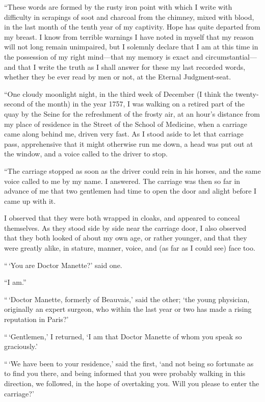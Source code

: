 ``These words are formed by the rusty iron point with which I write
with difficulty in scrapings of soot and charcoal from the chimney,
mixed with blood, in the last month of the tenth year of my captivity.
Hope has quite departed from my breast.  I know from terrible
warnings I have noted in myself that my reason will not long remain
unimpaired, but I solemnly declare that I am at this time in the
possession of my right mind---that my memory is exact and
circumstantial---and that I write the truth as I shall answer for
these my last recorded words, whether they be ever read by men or not,
at the Eternal Judgment-seat.

``One cloudy moonlight night, in the third week of December (I think
the twenty-second of the month) in the year 1757, I was walking on a
retired part of the quay by the Seine for the refreshment of the
frosty air, at an hour's distance from my place of residence in the
Street of the School of Medicine, when a carriage came along behind
me, driven very fast.  As I stood aside to let that carriage pass,
apprehensive that it might otherwise run me down, a head was put out
at the window, and a voice called to the driver to stop.

``The carriage stopped as soon as the driver could rein in his horses,
and the same voice called to me by my name.  I answered.  The carriage
was then so far in advance of me that two gentlemen had time to open
the door and alight before I came up with it.

I observed that they were both wrapped in cloaks, and appeared to
conceal themselves.  As they stood side by side near the carriage
door, I also observed that they both looked of about my own age, or
rather younger, and that they were greatly alike, in stature, manner,
voice, and (as far as I could see) face too.

``\,`You are Doctor Manette?' said one.

``I am.''

``\,`Doctor Manette, formerly of Beauvais,' said the other; `the young
physician, originally an expert surgeon, who within the last year or
two has made a rising reputation in Paris?'

``\,`Gentlemen,' I returned, `I am that Doctor Manette of whom you speak
so graciously.'

``\,`We have been to your residence,' said the first, `and not being so
fortunate as to find you there, and being informed that you were
probably walking in this direction, we followed, in the hope of
overtaking you. Will you please to enter the carriage?'

